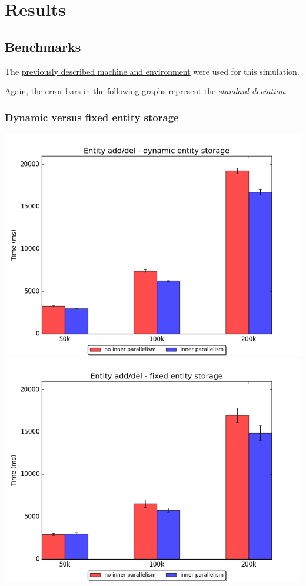 \documentclass[oneside, 12pt, a4paper, openany]{book}
\begin{document}
\section{Results}\label{results-1}

\subsection{Benchmarks}\label{benchmarks}

The \protect\hyperlink{bench_particlesim}{previously described machine
and environment} were used for this simulation.

Again, the error bars in the following graphs represent the
\emph{standard deviation}.

\subsubsection{Dynamic versus fixed entity
storage}\label{dynamic-versus-fixed-entity-storage-1}

\includegraphics{source/figures/bench2/ipcomp_dynamic.png}
\includegraphics{source/figures/bench2/ipcomp_fixed.png}
\end{document}
